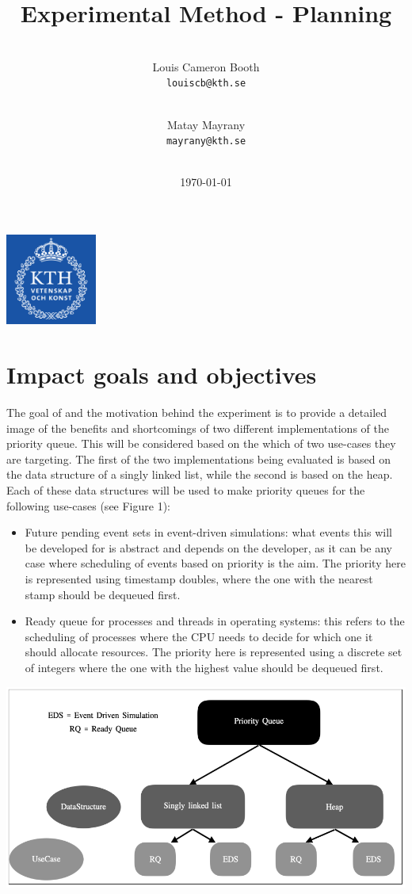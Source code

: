 \documentclass[12pt]{article}
\title{Experimental Method - Planning}
\author{
\\
  Louis Cameron Booth\\
  \texttt{louiscb@kth.se}
  \and
  \\
  Matay Mayrany\\
  \texttt{mayrany@kth.se}
  \\
  \\
}
\date{\today}
\begin{document}
\maketitle

\begin{center}
\includegraphics[width=3cm]{logo.png}
\end{center}

\pagebreak
\tableofcontents
\newpage
\section{Impact goals and objectives}

 The goal of and the motivation behind the experiment is to provide a detailed image of the benefits and shortcomings of two different implementations of the priority queue. This will be considered based on the which of two use-cases they are targeting. The first of the two implementations being evaluated is based on the data structure of a singly linked list, while the second is based on the heap. 
Each of these data structures will be used to make priority queues for the following use-cases (see Figure 1): 

\begin{itemize}
   \item Future pending event sets in event-driven simulations: what events this will be developed for is abstract and depends on the developer, as it can be any case where scheduling of events based on priority is the aim. The priority here is represented using timestamp doubles, where the one with the nearest stamp should be dequeued first.
   \item Ready queue for processes and threads in operating systems:
 this refers to the scheduling of processes where the CPU needs to decide for which one it should allocate resources. The priority here is represented using a discrete set of integers where the one with the highest value should be dequeued first. \end{itemize}

\begin{center}
\includegraphics[width=15cm]{figure-1.png}
\end{center}
\end{document}
